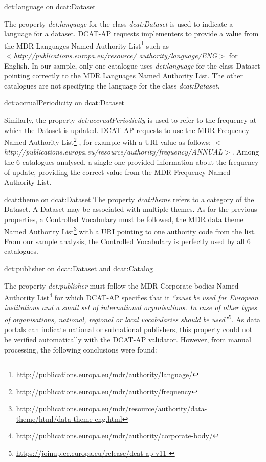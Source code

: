 \documentclass[<options>]{elsarticle}
\begin{document}
dct:language on dcat:Dataset

The property \textit{dct:language} for the class \textit{dcat:Dataset} is used to indicate a language for a dataset. DCAT-AP requests implementers to provide a value from the MDR Languages Named Authority List\footnote{\href{   http://publications.europa.eu/mdr/authority/language/}{    http://publications.europa.eu/mdr/authority/language/}} such as \\
\textit{$<$http://publications.europa.eu/resource/ authority/language/ENG$>$} for English. In our sample, only one catalogue uses \textit{dct:language} for the class Dataset pointing correctly to the MDR Languages Named Authority List. The other catalogues are not specifying the language for the class \textit{dcat:Dataset}.

dct:accrualPeriodicity on dcat:Dataset

Similarly, the property \textit{dct:accrualPeriodicity} is used to refer to the frequency at which the Dataset is updated. DCAT-AP requests to use the MDR Frequency Named Authority List\footnote{\href{    http://publications.europa.eu/mdr/authority/frequency}{     http://publications.europa.eu/mdr/authority/frequency}} , for example with a URI value as follows: \textit{$<$http://publications.europa.eu/resource/authority/frequency/ANNUAL$>$}. Among the 6 catalogues analysed, a single one provided information about the frequency of update, providing the correct value from the MDR Frequency Named Authority List.

dcat:theme on dcat:Dataset
The property \textit{dcat:theme }refers to a category of the Dataset. A Dataset may be associated with multiple themes. As for the previous properties, a Controlled Vocabulary must be followed, the MDR data theme Named Authority List\footnote{\href{     http://publications.europa.eu/mdr/resource/authority/data-theme/html/data-theme-eng.html}{      http://publications.europa.eu/mdr/resource/authority/data-theme/html/data-theme-eng.html}}  with a URI pointing to one authority code from the list. From our sample analysis, the Controlled Vocabulary is perfectly used by all 6 catalogues.

dct:publisher on dcat:Dataset and dcat:Catalog

The property \textit{dct:publisher} must follow the MDR Corporate bodies Named Authority List\footnote{\href{      http://publications.europa.eu/mdr/authority/corporate-body/}{       http://publications.europa.eu/mdr/authority/corporate-body/}} for which DCAT-AP specifies that it \textit{“must be used for European institutions and a small set of international organisations. In case of other types of organisations, national, regional or local vocabularies should be used”}\footnote{\href{       https://joinup.ec.europa.eu/release/dcat-ap-v11}{    https://joinup.ec.europa.eu/release/dcat-ap-v11 }}. As data portals can indicate national or subnational publishers, this property could not be verified automatically with the DCAT-AP validator. However, from manual processing, the following conclusions were found:
\end{document}
